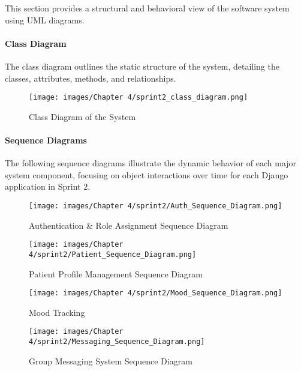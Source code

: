 This section provides a structural and behavioral view of the software system using UML diagrams.

\paragraph{Class Diagram}

The class diagram outlines the static structure of the system, detailing the classes, attributes, methods, and relationships.

\begin{figure}[H]
    \centering
    \texttt{[image: images/Chapter 4/sprint2\_class\_diagram.png]}
    \caption{Class Diagram of the System}
    \label{fig:class-diagram}
\end{figure}

\paragraph{Sequence Diagrams}

The following sequence diagrams illustrate the dynamic behavior of each major system component, focusing on object interactions over time for each Django application in Sprint 2.

\begin{figure}[H]
    \centering
    \texttt{[image: images/Chapter 4/sprint2/Auth\_Sequence\_Diagram.png]}
    \caption{Authentication \& Role Assignment Sequence Diagram}
    \label{fig:auth-sequence-diagram}
\end{figure}

\begin{figure}[H]
    \centering
    \texttt{[image: images/Chapter 4/sprint2/Patient\_Sequence\_Diagram.png]}
    \caption{Patient Profile Management Sequence Diagram}
    \label{fig:patient-sequence-diagram}
\end{figure}

\begin{figure}[H]
    \centering
    \texttt{[image: images/Chapter 4/sprint2/Mood\_Sequence\_Diagram.png]}
    \caption{Mood Tracking }
    \label{fig:mood-sequence-diagram}
\end{figure}

\begin{figure}[H]
    \centering
    \texttt{[image: images/Chapter 4/sprint2/Messaging\_Sequence\_Diagram.png]}
    \caption{Group Messaging System Sequence Diagram}
    \label{fig:messaging-sequence-diagram}
\end{figure}

